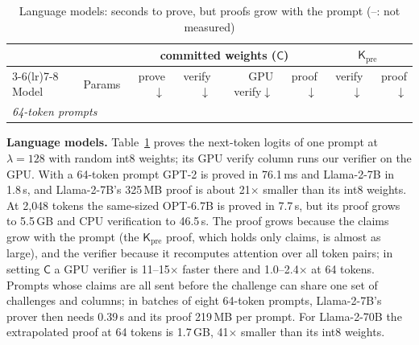 \documentclass[sigconf,nonacm]{acmart}
\newcommand{\Kpre}{\mathsf{K}_{\mathrm{pre}}}
\newcommand{\sC}{\mathsf{C}}
\newcommand{\para}[1]{\par\noindent\textbf{#1}\quad}
\begin{document}
\begin{table}[t]
  \caption{Language models: seconds to prove, but proofs grow with the prompt (--: not measured)}
  \label{tab:llm}
  \footnotesize
  \setlength{\tabcolsep}{2.4pt}
  \begin{tabular}{lrrrrrrr}
    \toprule
    & & \multicolumn{4}{c}{committed weights ($\sC$)} & \multicolumn{2}{c}{$\Kpre$} \\
    \cmidrule(lr){3-6}\cmidrule(lr){7-8}
    Model & Params & prove$\downarrow$ & verify$\downarrow$ & GPU verify$\downarrow$ & proof$\downarrow$ & verify$\downarrow$ & proof$\downarrow$ \\
    \midrule
    \multicolumn{8}{l}{\emph{64-token prompts}} \\
    
  \end{tabular}
\end{table}

\para{Language models.} Table~\ref{tab:llm} proves the next-token logits of one prompt at
$\lambda{=}128$ with random int8 weights; its GPU verify column runs our verifier on the GPU. With a
64-token prompt GPT-2 is proved in 76.1\,ms and Llama-2-7B in
1.8\,s, and Llama-2-7B's 325\,MB proof is about 21$\times$ smaller than its
int8 weights. At 2{,}048 tokens the same-sized OPT-6.7B is proved in 7.7\,s, but its proof grows to
5.5\,GB and CPU verification to 46.5\,s.
The proof grows because the claims grow with the prompt (the $\Kpre$ proof, which holds only
claims, is almost as large), and the verifier because it recomputes attention over
all token pairs; in setting
$\sC$ a GPU verifier is 11--15$\times$ faster there and 1.0--2.4$\times$ at 64
tokens. Prompts whose claims are all sent before the challenge can share one set of challenges and
columns; in batches of eight 64-token prompts, Llama-2-7B's prover then needs
0.39\,s and its proof 219\,MB per prompt. For Llama-2-70B the
extrapolated proof at 64 tokens is 1.7\,GB, 41$\times$ smaller than its int8
weights.
\end{document}
